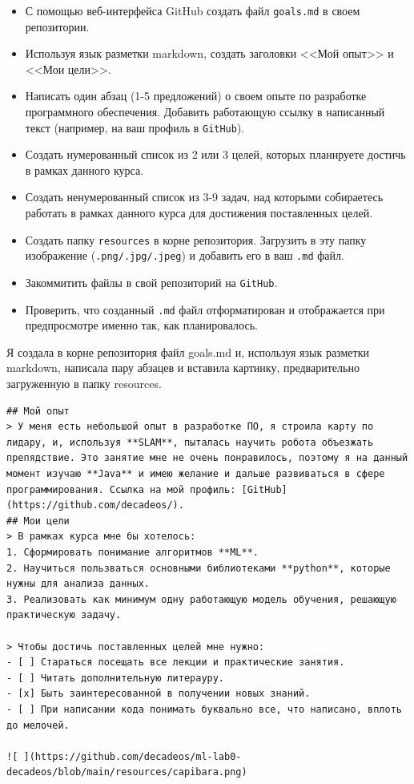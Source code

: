 \documentclass[a4paper,12pt]{article}
\begin{document}
	\begin{itemize}
		\item С помощью веб-интерфейса GitHub создать файл \texttt{goals.md} в своем репозитории.
		\item Используя язык разметки markdown, создать заголовки <<Мой опыт>> и <<Мои цели>>.
		\item Написать один абзац (1-5 предложений) о своем опыте по разработке программного обеспечения. Добавить работающую ссылку в написанный текст (например, на ваш профиль в \texttt{GitHub}).
		\item Создать нумерованный список из 2 или 3 целей, которых планируете достичь в рамках данного курса.
		\item Создать ненумерованный список из 3-9 задач, над которыми собираетесь работать в рамках данного курса для достижения поставленных целей.
		\item Создать папку \texttt{resources} в корне репозитория. Загрузить в эту папку изображение (\texttt{.png/.jpg/.jpeg}) и добавить его в ваш \texttt{.md} файл.
		\item Закоммитить файлы в свой репозиторий на \texttt{GitHub}.
		\item Проверить, что созданный \texttt{.md} файл отформатирован и отображается при предпросмотре именно так, как планировалось.
	\end{itemize}
	
	Я создала в корне репозитория файл goals.md и, используя язык разметки markdown, написала пару абзацев и вставила картинку, предварительно загруженную в папку resources.\\
	
	\begin{lstlisting}[caption={Содержимое файла \texttt{goals.md}}]
## Мой опыт
> У меня есть небольшой опыт в разработке ПО, я строила карту по лидару, и, используя **SLAM**, пыталась научить робота объезжать препядствие. Это занятие мне не очень понравилось, поэтому я на данный момент изучаю **Java** и имею желание и дальше развиваться в сфере программирования. Ссылка на мой профиль: [GitHub](https://github.com/decadeos/).
## Мои цели
> В рамках курса мне бы хотелось:
1. Сформировать понимание алгоритмов **ML**.
2. Научиться пользваться основными библиотеками **python**, которые нужны для анализа данных.
3. Реализовать как минимум одну работающую модель обучения, решающую практическую задачу.

> Чтобы достичь поставленных целей мне нужно:
- [ ] Стараться посещать все лекции и практические занятия.
- [ ] Читать дополнительную литерауру.
- [x] Быть заинтересованной в получении новых знаний.
- [ ] При написании кода понимать буквально все, что написано, вплоть до мелочей.

![ ](https://github.com/decadeos/ml-lab0-decadeos/blob/main/resources/capibara.png)
\end{lstlisting}
	
\end{document}
